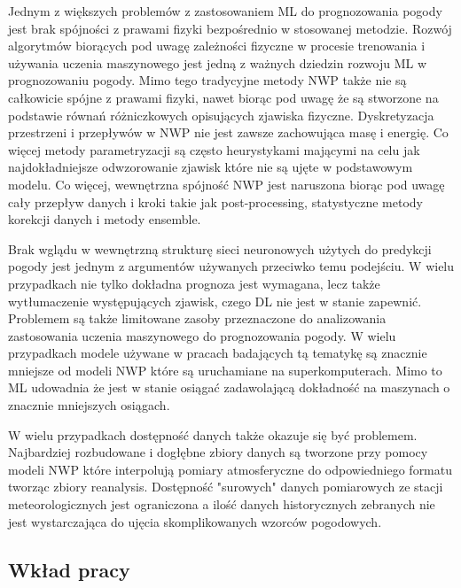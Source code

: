 Jednym z większych problemów z zastosowaniem ML do prognozowania pogody jest brak spójności
z prawami fizyki bezpośrednio w stosowanej metodzie. Rozwój algorytmów biorących pod uwagę
zależności fizyczne w procesie trenowania i używania uczenia maszynowego jest jedną z ważnych dziedzin
rozwoju ML w prognozowaniu pogody. Mimo tego tradycyjne metody NWP także nie są całkowicie spójne
z prawami fizyki, nawet biorąc pod uwagę że są stworzone na podstawie równań różniczkowych
opisujących zjawiska fizyczne. Dyskretyzacja przestrzeni i przepływów w NWP nie jest zawsze 
zachowująca masę i energię. Co więcej metody parametryzacji są często heurystykami 
mającymi na celu jak najdokładniejsze odwzorowanie zjawisk które nie są ujęte w podstawowym modelu.
Co więcej, wewnętrzna spójność NWP jest naruszona biorąc pod uwagę cały przepływ
danych i kroki takie jak post-processing, statystyczne metody korekcji danych i metody 
ensemble.

Brak wglądu w wewnętrzną strukturę sieci neuronowych użytych do predykcji pogody jest jednym
z argumentów używanych przeciwko temu podejściu. W wielu przypadkach nie tylko dokładna
prognoza jest wymagana, lecz także wytłumaczenie występujących zjawisk, czego DL nie jest w 
stanie zapewnić. Problemem są także limitowane zasoby przeznaczone do analizowania zastosowania
uczenia maszynowego do prognozowania pogody. W wielu przypadkach modele używane w pracach
badających tą tematykę są znacznie mniejsze od modeli NWP które są uruchamiane na superkomputerach.
Mimo to ML udowadnia że jest w stanie osiągać zadawolającą dokładność na maszynach o znacznie
mniejszych osiągach.

W wielu przypadkach dostępność danych także okazuje się być problemem. Najbardziej rozbudowane 
i dogłębne zbiory danych są tworzone przy pomocy modeli NWP które interpolują pomiary atmosferyczne
do odpowiedniego formatu tworząc zbiory reanalysis. Dostępność "surowych" danych pomiarowych 
ze stacji meteorologicznych
jest ograniczona a ilość danych historycznych zebranych nie jest wystarczająca do ujęcia 
skomplikowanych wzorców pogodowych.

\subsection{Wkład pracy}